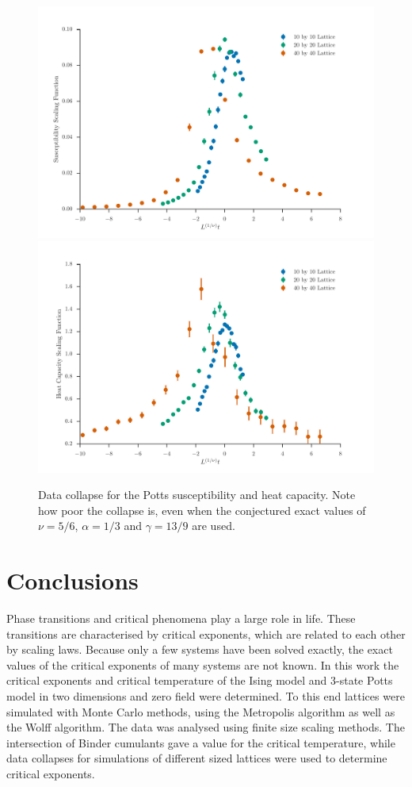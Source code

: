 \documentclass[11pt, a4paper]{report} %
\begin{document}
\begin{figure}[htb]
	\centering
	\includegraphics[width=\linewidth]{potts_susceptibility_data_collapse.pdf}
	\includegraphics[width=\linewidth]{potts_heat_capacity_data_collapse.pdf}
	\caption{Data collapse for the Potts susceptibility and heat capacity. Note how poor the collapse is, even when the conjectured exact values of \(\nu = 5/6\), \(\alpha=1/3\) and \(\gamma =13/9\) are used.}
	\label{fig:potts_exact_collapse}
\end{figure}


\chapter{Conclusions}

Phase transitions and critical phenomena play a large role in life.
These transitions are characterised by critical exponents, which are related to each other by scaling laws.
Because only a few systems have been solved exactly, the exact values of the critical exponents of many systems are not known.
In this work the critical exponents and critical temperature of the Ising model and 3-state Potts model in two dimensions and zero field were determined.
To this end lattices were simulated with Monte Carlo methods, using the Metropolis algorithm as well as the Wolff algorithm.
The data was analysed using finite size scaling methods.
The intersection of Binder cumulants gave a value for the critical temperature, while data collapses for simulations of different sized lattices were used to determine critical exponents.
\end{document}
